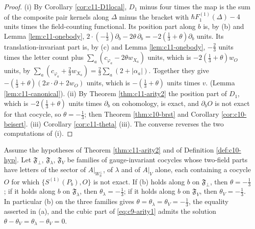 \begin{proof}
(i) By Corollary \ref{cor:c11-D1local}, $D_1$ minus four times the map is the sum of the composite pair kernels along $\Delta$ minus the bracket with $\hbar F_1^{(1)}(\Delta)-4$ units times the field-counting functional. Its position part along $b$ is, by (b) and Lemma \ref{lem:c11-onebody}, $2\cdot(-\tfrac13)\partial_b-2\theta\,\partial_b=-2(\tfrac13+\theta)\partial_b$ units. Its translation-invariant part is, by (c) and Lemma \ref{lem:c11-onebody}, $-\tfrac23$ units times the letter count plus $\sum_a(c_{\varphi_a}-2\theta w_{X_a})$ units, which is $-2(\tfrac13+\theta)w_O$ units, by $\sum_a(c_{\varphi_a}+\tfrac23w_{X_a})=\tfrac23\sum_a(2+|\alpha_a|)$. Together they give $-(\tfrac13+\theta)(2x\cdot\partial+2w_O)$ units, which is $-(\tfrac13+\theta)$ units times $v.$ (Lemma \ref{lem:c11-canonical}). (ii) By Theorem \ref{thm:c11-arity2} the position part of $D_1$, which is $-2(\tfrac13+\theta)$ units times $\partial_b$ on cohomology, is exact, and $\partial_bO$ is not exact for that cocycle, so $\theta=-\tfrac13$; then Theorem \ref{thm:c10-brst} and Corollary \ref{cor:c10-beisert}. (iii) Corollary \ref{cor:c11-theta} (iii). The converse reverses the two computations of (i).
\end{proof}

\begin{proposition}
\label{prop:c11-theta-sector}
Assume the hypotheses of Theorem \ref{thm:c11-arity2} and of Definition \ref{def:c10-hyp}. Let $\mathfrak F_\perp$, $\mathfrak F_\lambda$, $\mathfrak F_V$ be families of gauge-invariant cocycles whose two-field parts have letters of the sector of $A|_{W_{\mathbb R}^\perp}$, of $\lambda$ and of $A|_V$ alone, each containing a cocycle $O$ for which $\{S^{(1)}(P_b),O\}$ is not exact. If (b) holds along $b$ on $\mathfrak F_\perp$, then $\theta=-\tfrac13$; if it holds along $b$ on $\mathfrak F_\lambda$, then $\theta_\lambda=-\tfrac13$; if it holds along $b$ on $\mathfrak F_V$, then $\theta_V=-\tfrac13$. In particular (b) on the three families gives $\theta=\theta_\lambda=\theta_V=-\tfrac13$, the equality asserted in (a), and the cubic part of \eqref{eq:c9-arity1} admits the solution $\theta-\theta_V=\theta_\lambda-\theta_V=0$.
\end{proposition}

